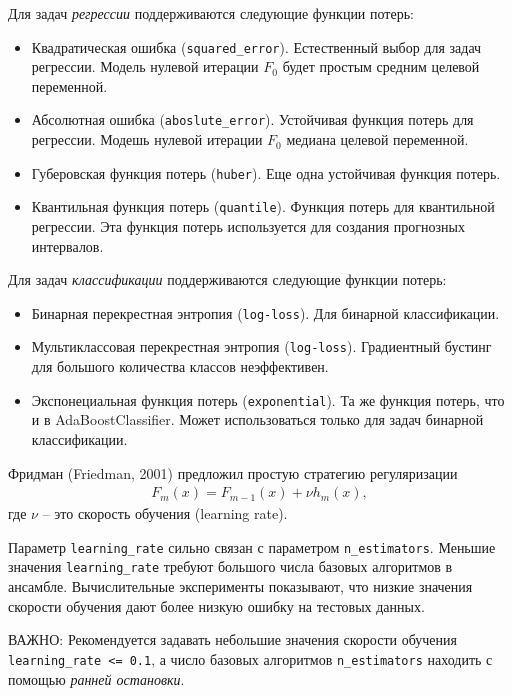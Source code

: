 \documentclass[%
	11pt,
	a4paper,
	utf8,
		]{article}
\begin{document}
Для задач \emph{регрессии} поддерживаются следующие функции потерь:
\begin{itemize}
	\item Квадратическая ошибка (\verb|squared_error|). Естественный выбор для задач регрессии. Модель нулевой итерации $ F_0 $ будет простым средним целевой переменной.
	
	\item Абсолютная ошибка (\verb|aboslute_error|). Устойчивая функция потерь для регрессии. Модешь нулевой итерации $ F_0 $ медиана целевой переменной.
	
	\item Губеровская функция потерь (\verb|huber|). Еще одна устойчивая функция потерь.
	
	\item Квантильная функция потерь (\verb|quantile|). Функция потерь для квантильной регрессии. Эта функция потерь используется для создания прогнозных интервалов.
\end{itemize}
\vspace*{3mm}
Для задач \emph{классификации} поддерживаются следующие функции потерь:
\begin{itemize}
	\item Бинарная перекрестная энтропия (\verb|log-loss|). Для бинарной классификации.
	
	\item Мультиклассовая перекрестная энтропия (\verb|log-loss|). Градиентный бустинг для большого количества классов неэффективен.
	
	\item Экспонециальная функция потерь (\verb|exponential|). Та же функция потерь, что и в AdaBoostClassifier. Может использоваться только для задач бинарной классификации.
\end{itemize}

Фридман (Friedman, 2001) предложил простую стратегию регуляризации
\begin{align*}
	F_m(x) = F_{m-1}(x) + \nu h_m(x),
\end{align*}
где $ \nu $ -- это скорость обучения (learning rate).

Параметр \verb|learning_rate| сильно связан с параметром \verb|n_estimators|. Меньшие значения \verb|learning_rate| требуют большого числа базовых алгоритмов в ансамбле. Вычислительные эксперименты показывают, что низкие значения скорости обучения дают более низкую ошибку на тестовых данных.

ВАЖНО: Рекомендуется задавать небольшие значения скорости обучения \verb|learning_rate <= 0.1|, а число базовых алгоритмов \verb|n_estimators| находить с помощью \emph{ранней остановки}.
\end{document}
